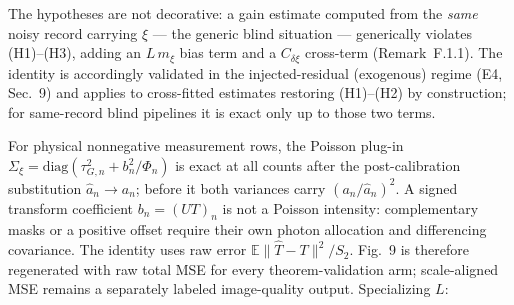 The hypotheses are not decorative: a gain estimate computed from the \emph{same} noisy record carrying $\xi$ --- the generic blind situation --- generically violates (H1)--(H3), adding an $L\,m_\xi$ bias term and a $C_{\delta\xi}$ cross-term (Remark~F.1.1). The identity is accordingly validated in the injected-residual (exogenous) regime (E4, Sec.~9) and applies to cross-fitted estimates restoring (H1)--(H2) by construction; for same-record blind pipelines it is exact only up to those two terms.

For physical nonnegative measurement rows, the Poisson plug-in $\Sigma_\xi=\mathrm{diag}(\tau_{G,n}^2+b_n^2/\Phi_n)$ is exact at all counts after the post-calibration substitution $\hat a_n\to a_n$; before it both variances carry $(a_n/\hat a_n)^2$. A signed transform coefficient $b_n=(UT)_n$ is not a Poisson intensity: complementary masks or a positive offset require their own photon allocation and differencing covariance. The identity uses raw error $\mathbb E\|\hat T-T\|^2/S_2$. Fig.~9 is therefore regenerated with raw total MSE for every theorem-validation arm; scale-aligned MSE remains a separately labeled image-quality output. Specializing $L$:

